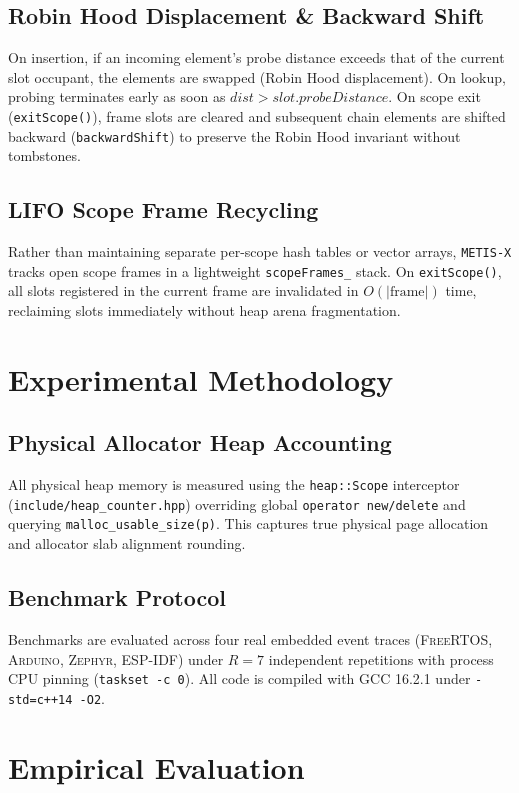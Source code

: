\documentclass[conference]{IEEEtran}
\begin{document}
\subsection{Robin Hood Displacement & Backward Shift}
On insertion, if an incoming element's probe distance exceeds that of the current slot occupant, the elements are swapped (Robin Hood displacement). On lookup, probing terminates early as soon as $dist > slot.probeDistance$. On scope exit (\texttt{exitScope()}), frame slots are cleared and subsequent chain elements are shifted backward (\texttt{backwardShift}) to preserve the Robin Hood invariant without tombstones.

\subsection{LIFO Scope Frame Recycling}
Rather than maintaining separate per-scope hash tables or vector arrays, \texttt{METIS-X} tracks open scope frames in a lightweight \texttt{scopeFrames\_} stack. On \texttt{exitScope()}, all slots registered in the current frame are invalidated in $O(|\text{frame}|)$ time, reclaiming slots immediately without heap arena fragmentation.

\section{Experimental Methodology}

\subsection{Physical Allocator Heap Accounting}
All physical heap memory is measured using the \texttt{heap::Scope} interceptor (\texttt{include/heap_counter.hpp}) overriding global \texttt{operator new/delete} and querying \texttt{malloc\_usable_size(p)}. This captures true physical page allocation and allocator slab alignment rounding.

\subsection{Benchmark Protocol}
Benchmarks are evaluated across four real embedded event traces (\textsc{FreeRTOS}, \textsc{Arduino}, \textsc{Zephyr}, \textsc{ESP-IDF}) under $R=7$ independent repetitions with process CPU pinning (\texttt{taskset -c 0}). All code is compiled with GCC 16.2.1 under \texttt{-std=c++14 -O2}.

\section{Empirical Evaluation}
\end{document}
